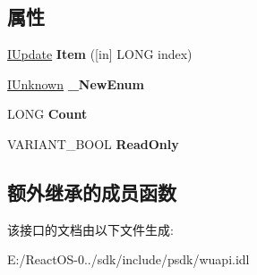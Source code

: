 \subsection*{属性}
\begin{DoxyCompactItemize}
\item 
\mbox{\label{interface_w_u_api_lib_1_1_i_update_collection_a9df4882a20d0524fa41ac03ee9e2c9bb}} 
\hyperlink{interface_w_u_api_lib_1_1_i_update}{I\+Update} {\bfseries Item} (\mbox{[}in\mbox{]} L\+O\+NG index)
\item 
\mbox{\label{interface_w_u_api_lib_1_1_i_update_collection_a00ba7daee9837300355f52e225619cf6}} 
\hyperlink{interface_i_unknown}{I\+Unknown} {\bfseries \+\_\+\+New\+Enum}
\item 
\mbox{\label{interface_w_u_api_lib_1_1_i_update_collection_a1a51d6a32b0828d62b59c0afeb421c58}} 
L\+O\+NG {\bfseries Count}
\item 
\mbox{\label{interface_w_u_api_lib_1_1_i_update_collection_a7e9a4e4da1f39ccb58b0ac315cb35666}} 
V\+A\+R\+I\+A\+N\+T\+\_\+\+B\+O\+OL {\bfseries Read\+Only}
\end{DoxyCompactItemize}
\subsection*{额外继承的成员函数}


该接口的文档由以下文件生成\+:\begin{DoxyCompactItemize}
\item 
E\+:/\+React\+O\+S-\/0../sdk/include/psdk/wuapi.\+idl\end{DoxyCompactItemize}
